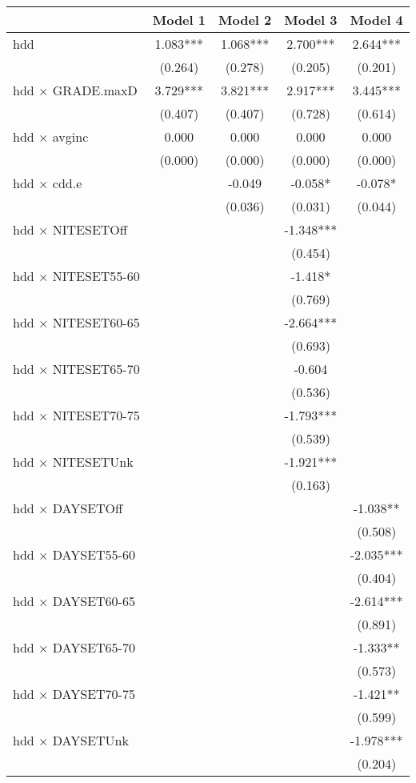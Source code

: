 \documentclass[
]{article}
\begin{document}
\begin{table}[H]
\centering
\begin{tabular}[t]{lcccc}
\toprule
  & Model 1 & Model 2 & Model 3 & Model 4\\
\midrule
hdd & 1.083*** & 1.068*** & 2.700*** & 2.644***\\
 & (0.264) & (0.278) & (0.205) & (0.201)\\
hdd × GRADE.maxD & 3.729*** & 3.821*** & 2.917*** & 3.445***\\
 & (0.407) & (0.407) & (0.728) & (0.614)\\
hdd × avginc & 0.000 & 0.000 & 0.000 & 0.000\\
 & (0.000) & (0.000) & (0.000) & (0.000)\\
hdd × cdd.e &  & -0.049 & -0.058* & -0.078*\\
 &  & (0.036) & (0.031) & (0.044)\\
hdd × NITESETOff &  &  & -1.348*** & \\
 &  &  & (0.454) & \\
hdd × NITESET55-60 &  &  & -1.418* & \\
 &  &  & (0.769) & \\
hdd × NITESET60-65 &  &  & -2.664*** & \\
 &  &  & (0.693) & \\
hdd × NITESET65-70 &  &  & -0.604 & \\
 &  &  & (0.536) & \\
hdd × NITESET70-75 &  &  & -1.793*** & \\
 &  &  & (0.539) & \\
hdd × NITESETUnk &  &  & -1.921*** & \\
 &  &  & (0.163) & \\
hdd × DAYSETOff &  &  &  & -1.038**\\
 &  &  &  & (0.508)\\
hdd × DAYSET55-60 &  &  &  & -2.035***\\
 &  &  &  & (0.404)\\
hdd × DAYSET60-65 &  &  &  & -2.614***\\
 &  &  &  & (0.891)\\
hdd × DAYSET65-70 &  &  &  & -1.333**\\
 &  &  &  & (0.573)\\
hdd × DAYSET70-75 &  &  &  & -1.421**\\
 &  &  &  & (0.599)\\
hdd × DAYSETUnk &  &  &  & -1.978***\\
 &  &  &  & (0.204)\\

\end{tabular}
\end{table}
\end{document}
